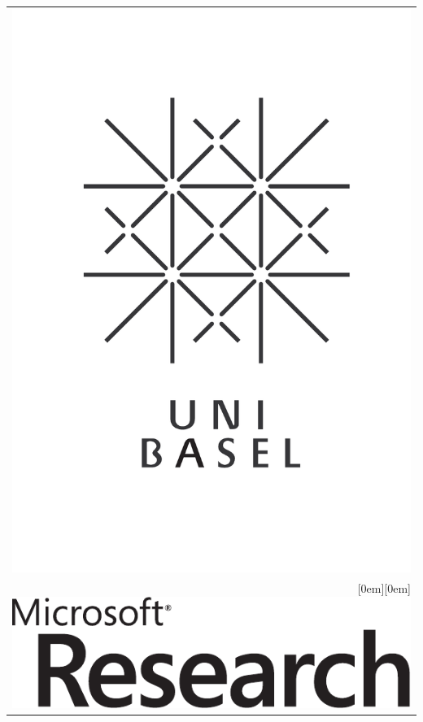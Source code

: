 \documentclass[landscape,a0paper,fontscale=0.292]{baposter}
\begin{document}
\begin{poster}
{\begin{tabular}{r}
    \includegraphics[height=0.12\textheight]{logo}\\
    \raisebox{0em}[0em][0em]{\includegraphics[height=0.03\textheight]{msrlogo}}
  \end{tabular}
 }



\end{poster}
\end{document}

